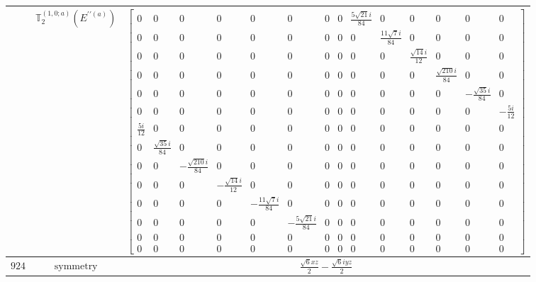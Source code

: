 \documentclass[fleqn,8pt,landscape]{jsarticle}
\begin{document}
\begin{longtable}{ccc}
$  $ & $ \mathbb{T}_{2}^{(1,0;a)}(E^{\prime\prime(a)}) $ & $ \begin{bmatrix} 0 & 0 & 0 & 0 & 0 & 0 & 0 & 0 & \frac{5 \sqrt{21} i}{84} & 0 & 0 & 0 & 0 & 0 \\ 0 & 0 & 0 & 0 & 0 & 0 & 0 & 0 & 0 & \frac{11 \sqrt{7} i}{84} & 0 & 0 & 0 & 0 \\ 0 & 0 & 0 & 0 & 0 & 0 & 0 & 0 & 0 & 0 & \frac{\sqrt{14} i}{12} & 0 & 0 & 0 \\ 0 & 0 & 0 & 0 & 0 & 0 & 0 & 0 & 0 & 0 & 0 & \frac{\sqrt{210} i}{84} & 0 & 0 \\ 0 & 0 & 0 & 0 & 0 & 0 & 0 & 0 & 0 & 0 & 0 & 0 & - \frac{\sqrt{35} i}{84} & 0 \\ 0 & 0 & 0 & 0 & 0 & 0 & 0 & 0 & 0 & 0 & 0 & 0 & 0 & - \frac{5 i}{12} \\ \frac{5 i}{12} & 0 & 0 & 0 & 0 & 0 & 0 & 0 & 0 & 0 & 0 & 0 & 0 & 0 \\ 0 & \frac{\sqrt{35} i}{84} & 0 & 0 & 0 & 0 & 0 & 0 & 0 & 0 & 0 & 0 & 0 & 0 \\ 0 & 0 & - \frac{\sqrt{210} i}{84} & 0 & 0 & 0 & 0 & 0 & 0 & 0 & 0 & 0 & 0 & 0 \\ 0 & 0 & 0 & - \frac{\sqrt{14} i}{12} & 0 & 0 & 0 & 0 & 0 & 0 & 0 & 0 & 0 & 0 \\ 0 & 0 & 0 & 0 & - \frac{11 \sqrt{7} i}{84} & 0 & 0 & 0 & 0 & 0 & 0 & 0 & 0 & 0 \\ 0 & 0 & 0 & 0 & 0 & - \frac{5 \sqrt{21} i}{84} & 0 & 0 & 0 & 0 & 0 & 0 & 0 & 0 \\ 0 & 0 & 0 & 0 & 0 & 0 & 0 & 0 & 0 & 0 & 0 & 0 & 0 & 0 \\ 0 & 0 & 0 & 0 & 0 & 0 & 0 & 0 & 0 & 0 & 0 & 0 & 0 & 0 \end{bmatrix} $ \\ \hline
$ 924 $ & $ \text{symmetry} $ & $ \frac{\sqrt{6} x z}{2} - \frac{\sqrt{6} i y z}{2} $ \\

\end{longtable}
\end{document}
